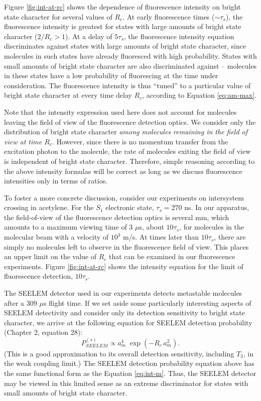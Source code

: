 \documentclass[12pt]{mitthesis}
\begin{document}
Figure \ref{fig:int-at-rc} shows the dependence of fluorescence
intensity on bright state character for several values of $R_c$.  At
early fluorescence times ($\sim \tau_s$), the fluorescence intensity
is greatest for states with large amounts of bright state character
($2/R_c > 1$).  At a delay of $5 \tau_s$, the fluorescence intensity
equation discriminates against states with large amounts of bright
state character, since molecules in such states have already
fluoresced with high probability.  States with small amounts of bright
state character are also discriminated against -- molecules in these
states have a low probability of fluorescing at the time under
consideration.  The fluorescence intensity is thus ``tuned'' to a
particular value of bright state character at every time delay $R_c$,
according to Equation \ref{eq:am-max}.

Note that the intensity expression used here does not account for
molecules leaving the field of view of the fluorescence detection
optics.  We consider only the distribution of bright state character
\emph{among molecules remaining in the field of view at time $R_c$}.
However, since there is no momentum transfer from the excitation
photon to the molecule, the rate of molecules exiting the field of
view is independent of bright state character.  Therefore,
simple reasoning according to the above intensity formulas will be
correct as long as we discuss fluorescence intensities only in terms
of ratios.

To foster a more concrete discussion, consider our experiments on
intersystem crossing in acetylene.  For the $S_1$ electronic state,
$\tau_s=270$ ns.  In our apparatus, the field-of-view of the
fluorescence detection optics is several mm, which amounts to a
maximum viewing time of 3 $\mu$s, about $10\tau_s$, for molecules in
the molecular beam with a velocity of $10^3$ m/s.  At times later than
$10\tau_s$, there are simply no molecules left to observe in the
fluorescence field of view.  This places an upper limit on the value
of $R_c$ that can be examined in our fluorescence experiments.  Figure
\ref{fig:int-at-rc} shows the intensity equation for the limit of
fluorescence detection, $10\tau_s$.

The SEELEM detector used in our experiments detects metastable
molecules after a 309 $\mu$s flight time.  If we set aside some
particularly interesting aspects of SEELEM detectivity and consider
only its detection sensitivity to bright state character, we arrive at
the following equation for SEELEM detection probability (Chapter 2,
equation 28):
\begin{equation}
  \label{eq:seelem-prob-s}
  P_{SEELEM}^{(s)} \propto a_m^4 \; \exp \left( -R_c \, a_m^2 \right).
\end{equation}
(This is a good approximation to its overall detection sensitivity,
including $T_3$, in the weak coupling limit.)  The SEELEM detection
probability equation above has the same functional form as the
Equation \ref{eq:int-m}.  Thus, the SEELEM detector may be viewed in
this limited sense as an extreme discriminator for states with small
amounts of bright state character.
\end{document}
